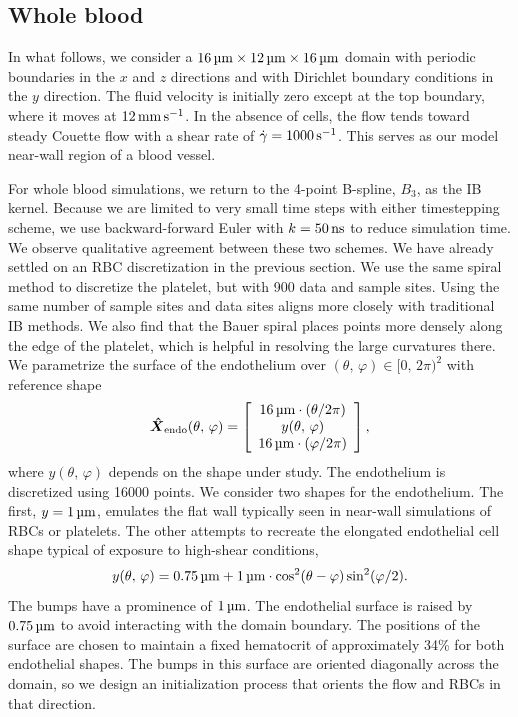 \subsection{Whole blood}\label{sec:whole-blood}

In what follows, we consider a $16\um\times12\um\times16\um$ domain with periodic
boundaries in the $x$ and $z$ directions and with Dirichlet boundary conditions in the
$y$ direction. The fluid velocity is initially zero except at the top boundary, where it
moves at $12\mmpersec$. In the absence of cells, the flow tends toward steady Couette
flow with a shear rate of $\shear=1000\persec$. This serves as our model near-wall region
of a blood vessel.

For whole blood simulations, we return to the 4-point B-spline, $B_3$, as the IB kernel.
Because we are limited to very small time steps with either timestepping scheme, we use
backward-forward Euler with $\timestep=50\ns$ to reduce simulation time. We observe
qualitative agreement between these two schemes.  We have already settled on an RBC
discretization in the previous section. We use the same spiral method to discretize the
platelet, but with 900 data and sample sites. Using the same number of sample sites and
data sites aligns more closely with traditional IB methods. We also find that the Bauer
spiral places points more densely along the edge of the platelet, which is helpful in
resolving the large curvatures there. We parametrize the surface of the endothelium over
$(\theta,\,\varphi) \in [0,\,2\pi)^2$ with reference shape
\begin{equation}
    \vec{\hat{X}}_\text{endo}(\theta,\,\varphi) = \left[\begin{array}{c}
            16\um\cdot(\theta/2\pi)  \\
            y(\theta,\,\varphi) \\
            16\um\cdot(\varphi/2\pi)
    \end{array}\right],
\end{equation}
where $y(\theta,\,\varphi)$ depends on the shape under study. The endothelium is
discretized using 16000 points. We consider two shapes for the endothelium. The first,
$y=1\um$, emulates the flat wall typically seen in near-wall simulations of RBCs or
platelets. The other attempts to recreate the elongated endothelial cell shape typical of
exposure to high-shear conditions,
\begin{equation*}
    y(\theta,\,\varphi) = 0.75\um + 1\um\cdot\cos^2(\theta-\varphi)\sin^2(\varphi/2).
\end{equation*}
The bumps have a prominence of $1\um$. The endothelial surface is raised by $0.75\um$ to
avoid interacting with the domain boundary. The positions of the surface are chosen to
maintain a fixed hematocrit of approximately 34\% for both endothelial shapes. The bumps
in this surface are oriented diagonally across the domain, so we design an initialization
process that orients the flow and RBCs in that direction.

